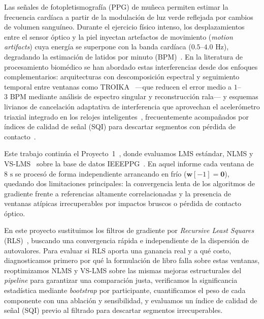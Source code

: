 \documentclass[conference]{IEEEtran}
\begin{document}
Las señales de fotopletismografía (PPG) de muñeca permiten estimar la frecuencia cardíaca a partir de la modulación de luz verde reflejada por cambios de volumen sanguíneo. Durante el ejercicio físico intenso, los desplazamientos entre el sensor óptico y la piel inyectan artefactos de movimiento (\textit{motion artifacts}) cuya energía se superpone con la banda cardíaca ($0.5$--$4.0\text{ Hz}$), degradando la estimación de latidos por minuto (BPM)~\cite{zhang2015troika}. En la literatura de procesamiento biomédico se han abordado estas interferencias desde dos enfoques complementarios: arquitecturas con descomposición espectral y seguimiento temporal entre ventanas como TROIKA~\cite{zhang2015troika} —que reducen el error medio a $1$--$3\text{ BPM}$ mediante análisis de espectro singular y reconstrucción rala— y esquemas livianos de cancelación adaptativa de interferencia que aprovechan el acelerómetro triaxial integrado en los relojes inteligentes~\cite{wood2007lowvar,mashhadi2016hr}, frecuentemente acompañados por índices de calidad de señal (SQI) para descartar segmentos con pérdida de contacto~\cite{krishnan2010twostage,elgendi2016sqi}.

Este trabajo continúa el Proyecto~1~\cite{informe1}, donde evaluamos LMS estándar, NLMS y VS-LMS~\cite{kwong1992vslms} sobre la base de datos IEEEPPG~\cite{tan2020ieeeppg}. En aquel informe cada ventana de $8\text{ s}$ se procesó de forma independiente arrancando en frío ($\mathbf{w}[-1]=\mathbf{0}$), quedando dos limitaciones principales: la convergencia lenta de los algoritmos de gradiente frente a referencias altamente correlacionadas y la presencia de ventanas atípicas irrecuperables por impactos bruscos o pérdida de contacto óptico.

En este proyecto sustituimos los filtros de gradiente por \textit{Recursive Least Squares} (RLS)~\cite{haykin2014,ressl2026pas}, buscando una convergencia rápida e independiente de la dispersión de autovalores. Para evaluar si RLS aporta una ganancia real y a qué costo, diagnosticamos primero por qué la formulación de libro falla sobre estas ventanas, reoptimizamos NLMS y VS-LMS sobre las mismas mejoras estructurales del \textit{pipeline} para garantizar una comparación justa, verificamos la significancia estadística mediante \textit{bootstrap} por participante, cuantificamos el peso de cada componente con una ablación y sensibilidad, y evaluamos un índice de calidad de señal (SQI) previo al filtrado para descartar segmentos irrecuperables.

\end{document}
